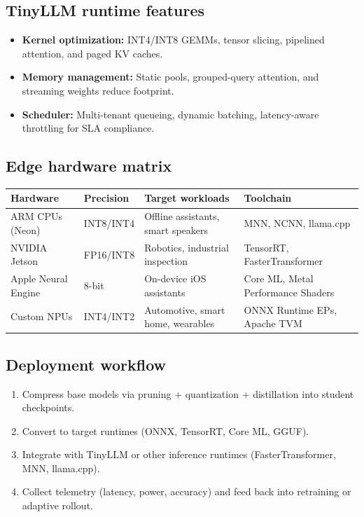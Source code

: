 \documentclass{article}
\begin{document}
\subsection{TinyLLM runtime features}
\begin{itemize}
  \item \textbf{Kernel optimization:} INT4/INT8 GEMMs, tensor slicing, pipelined attention, and paged KV caches.
  \item \textbf{Memory management:} Static pools, grouped-query attention, and streaming weights reduce footprint.
  \item \textbf{Scheduler:} Multi-tenant queueing, dynamic batching, latency-aware throttling for SLA compliance.
\end{itemize}

\subsection{Edge hardware matrix}
\begin{longtable}{p{3cm}p{3cm}p{4cm}p{4cm}}
\toprule
Hardware & Precision & Target workloads & Toolchain \\
\midrule
ARM CPUs (Neon) & INT8/INT4 & Offline assistants, smart speakers & MNN, NCNN, llama.cpp \\
NVIDIA Jetson & FP16/INT8 & Robotics, industrial inspection & TensorRT, FasterTransformer \\
Apple Neural Engine & 8-bit & On-device iOS assistants & Core ML, Metal Performance Shaders \\
Custom NPUs & INT4/INT2 & Automotive, smart home, wearables & ONNX Runtime EPs, Apache TVM \\
\bottomrule
\end{longtable}

\subsection{Deployment workflow}
\begin{enumerate}
  \item Compress base models via pruning + quantization + distillation into student checkpoints.
  \item Convert to target runtimes (ONNX, TensorRT, Core ML, GGUF).
  \item Integrate with TinyLLM or other inference runtimes (FasterTransformer, MNN, llama.cpp).
  \item Collect telemetry (latency, power, accuracy) and feed back into retraining or adaptive rollout.
\end{enumerate}
\end{document}
